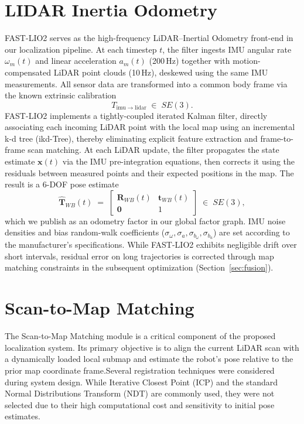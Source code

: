 \section{LIDAR Inertia Odometry} 
FAST-LIO2 serves as the high-frequency LiDAR–Inertial Odometry front-end in our localization pipeline. At each timestep \(t\), the filter ingests IMU angular rate \(\omega_m(t)\) and linear acceleration \(a_m(t)\) (200\,Hz) together with motion-compensated LiDAR point clouds (10\,Hz), deskewed using the same IMU measurements. All sensor data are transformed into a common body frame via the known extrinsic calibration 
\begin{equation}
	T_{\mathrm{imu}\to\mathrm{lidar}}
	\;\in\;SE(3).
\end{equation}
FAST-LIO2 implements a tightly-coupled iterated Kalman filter, directly associating each incoming LiDAR point with the local map using an incremental k-d tree (ikd-Tree), thereby eliminating explicit feature extraction and frame-to-frame scan matching. At each LiDAR update, the filter propagates the state estimate \(\mathbf{x}(t)\) via the IMU pre-integration equations, then corrects it using the residuals between measured points and their expected positions in the map. The result is a 6-DOF pose estimate
\begin{equation}
	\hat{\mathbf{T}}_{WB}(t)
	\;=\;
	\begin{bmatrix}
		\mathbf{R}_{WB}(t) & \mathbf{t}_{WB}(t) \\
		\mathbf{0}           & 1
	\end{bmatrix}
	\;\in\;SE(3),
\end{equation}
which we publish as an odometry factor in our global factor graph. IMU noise densities and bias random-walk coefficients (\(\sigma_\omega, \sigma_a, \sigma_{b_\omega}, \sigma_{b_a}\)) are set according to the manufacturer’s specifications. While FAST-LIO2 exhibits negligible drift over short intervals, residual error on long trajectories is corrected through map matching constraints in the subsequent optimization (Section~\ref{sec:fusion}).


\section{Scan-to-Map Matching}
The Scan-to-Map Matching module is a critical component of the proposed localization system. Its primary objective is to align the current LiDAR scan with a dynamically loaded local submap and estimate the robot’s pose relative to the prior map coordinate frame.Several registration techniques were considered during system design. While Iterative Closest Point (ICP)\cite{BeslICP1992} and the standard Normal Distributions Transform (NDT)\cite{biber2003ndt} are commonly used, they were not selected due to their high computational cost and sensitivity to initial pose estimates.

